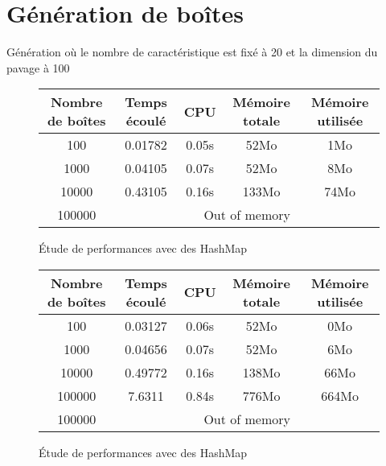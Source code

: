 \chapter{Génération de boîtes}
Génération où le nombre de caractéristique est fixé à 20 et la dimension du pavage à 100
\begin{figure}[h]
  \centering
\begin{tabular}{|c|c|c|c|c|}
\hline
Nombre de boîtes & Temps écoulé & CPU & Mémoire totale & Mémoire utilisée\\
\hline
100 & 0.01782 & 0.05s & 52Mo & 1Mo\\
\hline
1000 & 0.04105 & 0.07s & 52Mo & 8Mo\\
\hline
10000 & 0.43105 & 0.16s & 133Mo & 74Mo\\
\hline
100000 & \multicolumn{4}{|c|}{Out of memory}\\
\hline
\end{tabular}
\caption{Étude de performances avec des HashMap}
\end{figure}



\begin{figure}[h]
  \centering
\begin{tabular}{|c|c|c|c|c|}
\hline
Nombre de boîtes & Temps écoulé & CPU & Mémoire totale & Mémoire utilisée\\
\hline
100 & 0.03127 & 0.06s & 52Mo & 0Mo\\
\hline
1000 & 0.04656 & 0.07s & 52Mo & 6Mo\\
\hline
10000 & 0.49772 & 0.16s & 138Mo & 66Mo\\
\hline
100000 & 7.6311 & 0.84s & 776Mo & 664Mo\\
\hline
100000 & \multicolumn{4}{|c|}{Out of memory}\\
\hline
\end{tabular}
\caption{Étude de performances avec des HashMap}
\end{figure}